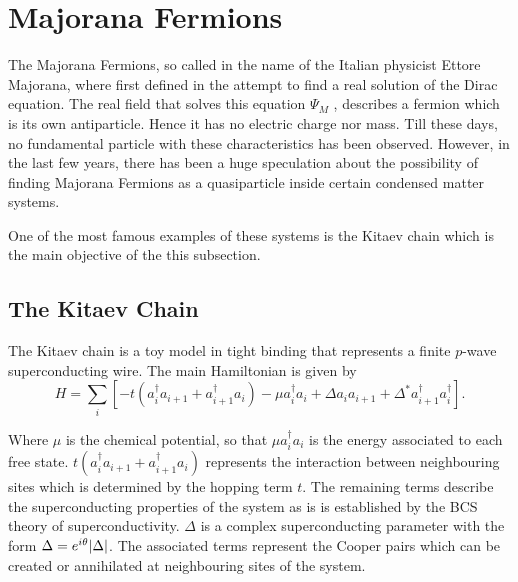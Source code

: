 



\section{Majorana Fermions}

The  Majorana Fermions, so called in the name of the Italian physicist Ettore Majorana, where first defined in the attempt to find a real solution of the Dirac equation. The real field that solves this equation $\Psi_M$ , describes a fermion which is its own antiparticle. Hence it has no electric charge nor mass.  Till these days, no fundamental particle with these characteristics has been observed. However, in the last few years, there has been a huge speculation about the possibility of finding Majorana Fermions as a quasiparticle inside certain condensed matter systems. 

One of the most famous examples of these systems is the Kitaev chain which is the main objective of the this subsection. 


\subsection{The Kitaev Chain}
The Kitaev chain is a toy model in tight binding that represents a  finite $p$-wave superconducting wire. The main Hamiltonian is given by 
\begin{equation}
H = \sum_{i} \left[ -t(a_i^{\dagger} a_{i+1} + a_{i+1}^{\dagger}a_i) -\mu a_i^{\dagger} a_{i} +  \Delta a_{i}a_{i+1} + \Delta^* a_{i+1}^{\dagger}a_i^{\dagger} \right].  \label{eq:kitaevHam}
\end{equation}

Where $\mu$ is the chemical potential, so that $\mu a_i^{\dagger} a_{i}$ is the energy associated to each free state. $t(a_i^{\dagger} a_{i+1} + a_{i+1}^{\dagger}a_i)$ represents the interaction between neighbouring sites which is determined by the hopping term $t$. The remaining terms describe the superconducting properties of the system as is is established by the BCS theory of superconductivity. $\Delta$ is a complex superconducting parameter with the form  $\Delta = e^{i\theta} \vert \Delta \vert$. The associated terms represent the Cooper pairs which can be created or annihilated at neighbouring sites of the system.

